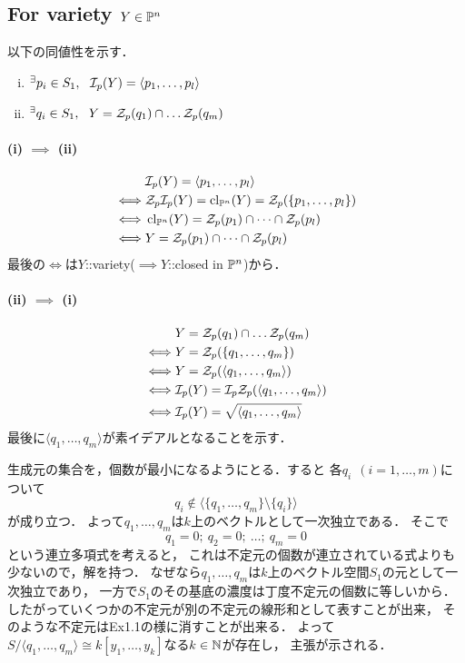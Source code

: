 \documentclass[a4paper]{jsarticle}
\begin{document}
    \subsection{For variety $Y \in \mathbb{P}^n$}
    以下の同値性を示す．
    \begin{enumerate}[(i)]
        \item ${}^{\exists} p_i \in S_1,~~ \mathcal{I}_p(Y)=\langle p_1, \dots, p_l \rangle$
        \item ${}^{\exists} q_i \in S_1,~~ Y=\mathcal{Z}_p(q_1) \cap \dots \mathcal{Z}_p(q_m)$
    \end{enumerate}
    \paragraph{(i) $\implies$ (ii)}
    \begin{align*}
            &   \mathcal{I}_p(Y)=\langle p_1, \dots, p_l \rangle \\
        \iff&   \mathcal{Z}_p \mathcal{I}_p(Y)=\operatorname{cl}_{\mathbb{P}^n}(Y)=\mathcal{Z}_p(\{ p_1, \dots, p_l \}) \\
        \iff&   \operatorname{cl}_{\mathbb{P}^n}(Y)=\mathcal{Z}_p(p_1)\cap \dots \cap \mathcal{Z}_p(p_l) \\
        \iff&   Y=\mathcal{Z}_p(p_1)\cap \dots \cap \mathcal{Z}_p(p_l)
    \end{align*}
    最後の$\iff$は$Y$::variety($\implies Y$::closed in $\mathbb{P}^n$)から．

    \paragraph{(ii) $\implies$ (i)}
    \begin{align*}
            &   Y=\mathcal{Z}_p(q_1) \cap \dots \mathcal{Z}_p(q_m) \\
        \iff&   Y=\mathcal{Z}_p(\{q_1, \dots, q_m \}) \\
        \iff&   Y=\mathcal{Z}_p(\langle q_1, \dots, q_m \rangle) \\
        \iff&   \mathcal{I}_p(Y)=\mathcal{I}_p \mathcal{Z}_p(\langle q_1, \dots, q_m \rangle) \\
        \iff&   \mathcal{I}_p(Y)=\sqrt{\langle q_1, \dots, q_m \rangle}
    \end{align*}
    最後に$\langle q_1, \dots, q_m \rangle$が素イデアルとなることを示す．
    
    生成元の集合を，個数が最小になるようにとる．すると
    各$q_i~~(i=1,\dots,m)$について
    \[ q_i \not \in \langle \{q_1, \dots, q_m\} \setminus \{q_i\} \rangle \]が成り立つ．
    よって$q_1, \dots, q_m$は$k$上のベクトルとして一次独立である．
    そこで
    \[ q_1=0;~ q_2=0;~ \dots;~ q_m=0 \]
    という連立多項式を考えると，
    これは不定元の個数が連立されている式よりも少ないので，解を持つ．
    なぜなら$q_1, \dots, q_m$は$k$上のベクトル空間$S_1$の元として一次独立であり，
    一方で$S_1$のその基底の濃度は丁度不定元の個数に等しいから．
    したがっていくつかの不定元が別の不定元の線形和として表すことが出来，
    そのような不定元はEx1.1の様に消すことが出来る．
    よって$S/\langle q_1, \dots, q_m \rangle \cong k[y_1,\dots,y_k]$なる$k \in \mathbb{N}$が存在し，
    主張が示される．
\end{document}
